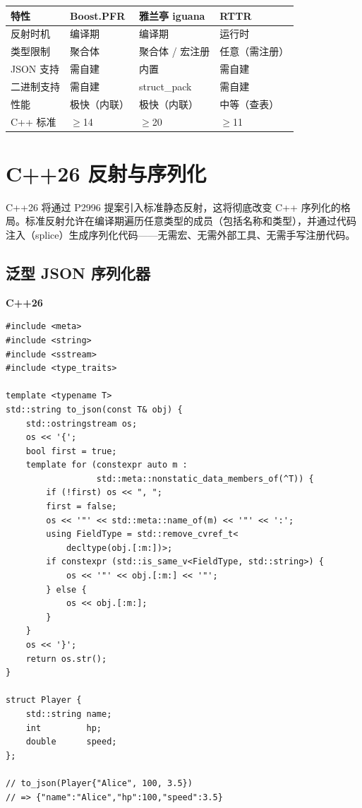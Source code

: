 \documentclass[12pt,a4paper,fontset=fandol]{ctexbook}
\newcommand{\refllabel}{%
  \noindent\begin{tcolorbox}[colback=reflheadbg,coltext=white,
    sharp corners,boxrule=0pt,width=4em,height=1.4em,
    halign=center,valign=center,nobeforeafter,left=0pt,right=0pt,
    top=0pt,bottom=0pt]\small\bfseries C++26\end{tcolorbox}}
\begin{document}
\begin{compare}[title={反射序列化方案对比}]
\begin{tabular}{l p{3.2cm} p{3.2cm} p{3.2cm}}
\toprule
\textbf{特性} & \textbf{Boost.PFR} & \textbf{雅兰亭 iguana} & \textbf{RTTR} \\
\midrule
反射时机 & 编译期 & 编译期 & 运行时 \\
类型限制 & 聚合体 & 聚合体 / 宏注册 & 任意（需注册） \\
JSON 支持 & 需自建 & 内置 & 需自建 \\
二进制支持 & 需自建 & struct\_pack & 需自建 \\
性能 & 极快（内联） & 极快（内联） & 中等（查表） \\
C++ 标准 & $\ge$14 & $\ge$20 & $\ge$11 \\
\bottomrule
\end{tabular}
\end{compare}

\chapter{C++26 反射与序列化}\label{ch:cpp26}

C++26 将通过 P2996 提案引入标准静态反射，这将彻底改变 C++ 序列化的格局。标准反射允许在编译期遍历任意类型的成员（包括名称和类型），并通过代码注入（splice）生成序列化代码——无需宏、无需外部工具、无需手写注册代码。

\section{泛型 JSON 序列化器}\label{sec:cpp26-json}

\refllabel
\begin{lstlisting}[caption={C++26 反射: 一个泛型函数序列化任意类型}]
#include <meta>
#include <string>
#include <sstream>
#include <type_traits>

template <typename T>
std::string to_json(const T& obj) {
    std::ostringstream os;
    os << '{';
    bool first = true;
    template for (constexpr auto m :
                  std::meta::nonstatic_data_members_of(^T)) {
        if (!first) os << ", ";
        first = false;
        os << '"' << std::meta::name_of(m) << '"' << ':';
        using FieldType = std::remove_cvref_t<
            decltype(obj.[:m:])>;
        if constexpr (std::is_same_v<FieldType, std::string>) {
            os << '"' << obj.[:m:] << '"';
        } else {
            os << obj.[:m:];
        }
    }
    os << '}';
    return os.str();
}

struct Player {
    std::string name;
    int         hp;
    double      speed;
};

// to_json(Player{"Alice", 100, 3.5})
// => {"name":"Alice","hp":100,"speed":3.5}
\end{lstlisting}
\end{document}
